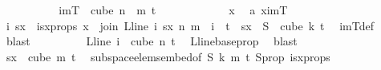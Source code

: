 \begin{isabellebody}
\isanewline
\isanewline
\ \ \ \ \isamarkupfalse%
\isanewline
\ \ \ \ \isamarkupfalse%
\ {\isachardoublequoteopen}imT\ {\isasymsubseteq}\ cube\ {\isacharparenleft}{\kern0pt}n\ {\isacharplus}{\kern0pt}\ m{\isacharparenright}{\kern0pt}\ {\isacharparenleft}{\kern0pt}t{\isacharplus}{\kern0pt}{}{\isacharparenright}{\kern0pt}{\isachardoublequoteclose}\isanewline
\ \ \ \ \isamarkupfalse%
\isanewline
\ \ \ \ \ \ \isamarkupfalse%
\ x\ \isamarkupfalse%
\ a{\isacharcolon}{\kern0pt}\ {\isachardoublequoteopen}x{\isasymin}imT{\isachardoublequoteclose}\isanewline
\ \ \ \ \ \ \isamarkupfalse%
\ \isamarkupfalse%
\ i\ sx\ \ isx{\isacharunderscore}{\kern0pt}props{\isacharcolon}{\kern0pt}\ {\isachardoublequoteopen}x\ {\isacharequal}{\kern0pt}\ join\ {\isacharparenleft}{\kern0pt}L{\isacharunderscore}{\kern0pt}line\ i{\isacharparenright}{\kern0pt}\ sx\ n\ m\ {\isasymand}\ i\ {\isasymin}\ {\isacharbraceleft}{\kern0pt}{\isachardot}{\kern0pt}{\isachardot}{\kern0pt}{\isacharless}{\kern0pt}t{\isacharplus}{\kern0pt}{}{\isacharbraceright}{\kern0pt}\ {\isasymand}\ sx\ {\isasymin}\ S\ {\isacharbackquote}{\kern0pt}\ {\isacharparenleft}{\kern0pt}cube\ k\ {\isacharparenleft}{\kern0pt}t{\isacharplus}{\kern0pt}{}{\isacharparenright}{\kern0pt}{\isacharparenright}{\kern0pt}{\isachardoublequoteclose}\ \isamarkupfalse%
\ imT{\isacharunderscore}{\kern0pt}def\ \isamarkupfalse%
\ blast\isanewline
\ \ \ \ \ \ \isamarkupfalse%
\ \isamarkupfalse%
\ {\isachardoublequoteopen}L{\isacharunderscore}{\kern0pt}line\ i\ {\isasymin}\ cube\ n\ {\isacharparenleft}{\kern0pt}t{\isacharplus}{\kern0pt}{}{\isacharparenright}{\kern0pt}{\isachardoublequoteclose}\ \isamarkupfalse%
\ L{\isacharunderscore}{\kern0pt}line{\isacharunderscore}{\kern0pt}base{\isacharunderscore}{\kern0pt}prop\ \isamarkupfalse%
\ blast\isanewline
\ \ \ \ \ \ \isamarkupfalse%
\ \isamarkupfalse%
\ {\isachardoublequoteopen}sx\ {\isasymin}\ cube\ m\ {\isacharparenleft}{\kern0pt}t{\isacharplus}{\kern0pt}{}{\isacharparenright}{\kern0pt}{\isachardoublequoteclose}\ \isamarkupfalse%
\ subspace{\isacharunderscore}{\kern0pt}elems{\isacharunderscore}{\kern0pt}embed{\isacharbrackleft}{\kern0pt}of\ {\isachardoublequoteopen}S{\isachardoublequoteclose}\ {\isachardoublequoteopen}k{\isachardoublequoteclose}\ {\isachardoublequoteopen}m{\isachardoublequoteclose}\ {\isachardoublequoteopen}t{\isacharplus}{\kern0pt}{}{\isachardoublequoteclose}{\isacharbrackright}{\kern0pt}\ S{\isacharunderscore}{\kern0pt}prop\ isx{\isacharunderscore}{\kern0pt}props\ \isamarkupfalse%

\end{isabellebody}
